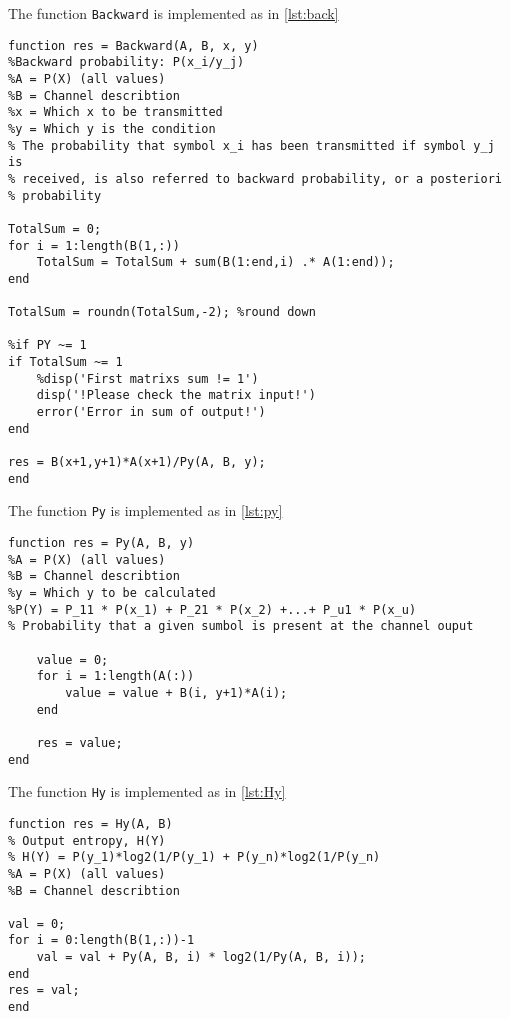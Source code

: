 \documentclass[Main]{subfiles}
\begin{document}
The function \texttt{Backward} is implemented as in \codeTitle \ref{lst:back}

\begin{lstlisting}[caption=Backward, style=Code-Matlab, label=lst:back]
function res = Backward(A, B, x, y)
%Backward probability: P(x_i/y_j)
%A = P(X) (all values)
%B = Channel describtion
%x = Which x to be transmitted
%y = Which y is the condition
% The probability that symbol x_i has been transmitted if symbol y_j is 
% received, is also referred to backward probability, or a posteriori 
% probability

TotalSum = 0;
for i = 1:length(B(1,:))
    TotalSum = TotalSum + sum(B(1:end,i) .* A(1:end));
end

TotalSum = roundn(TotalSum,-2); %round down

%if PY ~= 1
if TotalSum ~= 1
    %disp('First matrixs sum != 1')
    disp('!Please check the matrix input!')
    error('Error in sum of output!')
end

res = B(x+1,y+1)*A(x+1)/Py(A, B, y);
end
\end{lstlisting}


The function \texttt{Py} is implemented as in \codeTitle \ref{lst:py}

\begin{lstlisting}[caption=Py, style=Code-Matlab, label=lst:py]
function res = Py(A, B, y)
%A = P(X) (all values)
%B = Channel describtion
%y = Which y to be calculated
%P(Y) = P_11 * P(x_1) + P_21 * P(x_2) +...+ P_u1 * P(x_u)
% Probability that a given sumbol is present at the channel ouput

    value = 0;
    for i = 1:length(A(:))
        value = value + B(i, y+1)*A(i);
    end
    
    res = value;
end
\end{lstlisting}


The function \texttt{Hy} is implemented as in \codeTitle \ref{lst:Hy}


\begin{lstlisting}[caption=Hy, style=Code-Matlab, label=lst:Hy]
function res = Hy(A, B)
% Output entropy, H(Y)
% H(Y) = P(y_1)*log2(1/P(y_1) + P(y_n)*log2(1/P(y_n)
%A = P(X) (all values)
%B = Channel describtion

val = 0;
for i = 0:length(B(1,:))-1
    val = val + Py(A, B, i) * log2(1/Py(A, B, i));
end
res = val;
end
\end{lstlisting}
\end{document}
